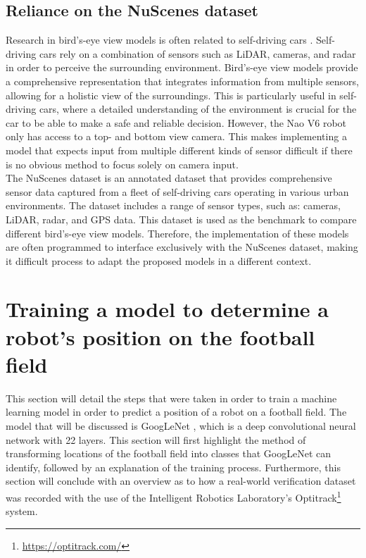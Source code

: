 \documentclass{uva-inf-bachelor-thesis}
\begin{document}
        \subsection{Reliance on the NuScenes dataset}
            Research in bird's-eye view models is often related to self-driving cars \cite{liftsplatshoot} \cite{ex1} \cite{ex2}. Self-driving cars rely on a combination of sensors such as LiDAR, cameras, and radar in order to perceive the surrounding environment. Bird's-eye view models provide a comprehensive representation that integrates information from multiple sensors, allowing for a holistic view of the surroundings. This is particularly useful in self-driving cars, where a detailed understanding of the environment is crucial for the car to be able to make a safe and reliable decision. However, the Nao V6 robot only has access to a top- and bottom view camera. This makes implementing a model that expects input from multiple different kinds of sensor difficult if there is no obvious method to focus solely on camera input. 
            \hfill \break \\
            The NuScenes dataset \cite{nuscenes} is an annotated dataset that provides comprehensive sensor data captured from a fleet of self-driving cars operating in various urban environments. The dataset includes a range of sensor types, such as: cameras, LiDAR, radar, and GPS data. This dataset is used as the benchmark to compare different bird's-eye view models\cite{liftsplatshoot}. Therefore, the implementation of these models are often programmed to interface exclusively with the NuScenes dataset, making it difficult process to adapt the proposed models in a different context. 

    \section{Training a model to determine a robot's position on the football field}    
        This section will detail the steps that were taken in order to train a machine learning model in order to predict a position of a robot on a football field. The model that will be discussed is GoogLeNet \cite{googlenet} , which is a deep convolutional neural network with 22 layers.
        This section will first highlight the method of transforming locations of the football field into classes that GoogLeNet can identify, followed by an explanation of the training process. Furthermore, this section will conclude with an overview as to how a real-world verification dataset was recorded with the use of the Intelligent Robotics Laboratory's Optitrack\footnote{\url{https://optitrack.com/}} system. 
\end{document}
